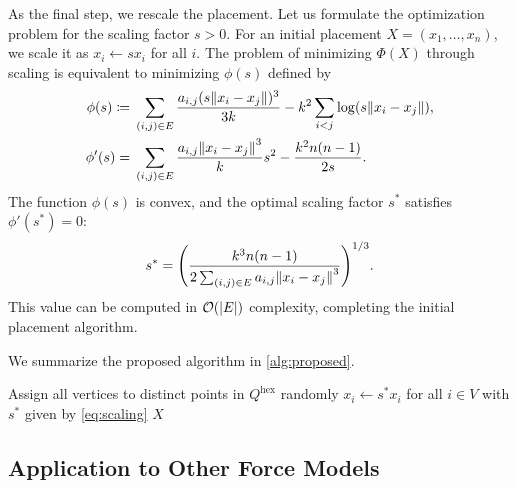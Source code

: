 \documentclass{jgaa-art}
\newcommand{\defeq}{\coloneqq}
\begin{document}
As the final step, we rescale the placement.
Let us formulate the optimization problem for the scaling factor $s > 0$.
For an initial placement $X = (x_{1}, \dots, x_{n})$, we scale it as $x_{i}\gets s x_{i}$ for all $i$.
The problem of minimizing $\Phi(X)$ through scaling is equivalent to minimizing $\phi(s)$ defined by
\begin{align*}
  \phi(s) \defeq{} & \sum_{(i,j) \in E}\frac{a_{i,j}(s \norm{x_i - x_j})^{3}}{3k}- k^{2}\sum_{i < j}\log(s \norm{x_i - x_j}), \\
  \phi'(s) ={}     & \sum_{(i,j) \in E}\frac{a_{i,j}\norm{x_i - x_j}^{3}}{k}s^{2}- \frac{k^{2}n(n-1)}{2s}.
\end{align*}
The function $\phi(s)$ is convex, and the optimal scaling factor $s^{*}$ satisfies $\phi'(s^{*}) = 0$:
\begin{equation}
  \label{eq:scaling}
  s^{*} = \qty(\frac{k^{3}n(n-1)}{2 \sum_{(i,j) \in E}a_{i,j}\norm{x_i - x_j}^{3}})^{1/3}.
\end{equation}
This value can be computed in $\order{\abs{E}}$ complexity, completing the initial placement algorithm.

We summarize the proposed algorithm in \cref{alg:proposed}.

\begin{algorithm}[t]
  \caption{Proposed algorithm for the initial placement}
  \label{alg:proposed} 
  Assign all vertices to distinct points in $Q^{\mathrm{hex}}$ randomly\;
  $x_{i}\gets s^{*}x_{i}$ for all $i \in V$ with $s^{*}$ given by \cref{eq:scaling}\;
    \Return $X$
\end{algorithm}

\subsection{Application to Other Force Models}
\label{sec:otherForceModels}
\end{document}
